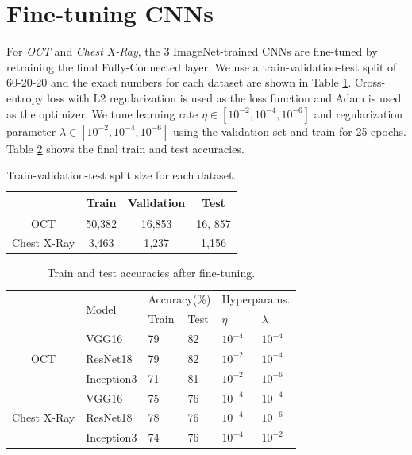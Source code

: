 \section{Fine-tuning CNNs}

For \textit{OCT} and \textit{Chest X-Ray}, the 3 ImageNet-trained CNNs are fine-tuned by retraining the final Fully-Connected layer.
We use a train-validation-test split of 60-20-20 and the exact numbers for each dataset are shown in Table \ref{tbl:dataset_sizes}.
Cross-entropy loss with L2 regularization is used as the loss function and  Adam \cite{kingma2014adam} is used as the optimizer.
We tune learning rate $\eta \in [10^{-2}, 10^{-4}, 10^{-6}]$ and regularization parameter $\lambda \in [10^{-2}, 10^{-4}, 10^{-6}]$ using the validation set and train for 25 epochs.
Table \ref{tbl:finetune_accuracies} shows the final train and test accuracies.

\begin{table}[ht]
\begin{tabular}{cccc}
 & Train & Validation & Test \\ \hline
\hline
OCT & 50,382 & 16,853 & 16, 857 \\ \hline
Chest X-Ray & 3,463 & 1,237 & 1,156 \\ \hline
\end{tabular}
\caption{Train-validation-test split size for each dataset.}
\vspace{-6mm}
\label{tbl:dataset_sizes}
\end{table}

\begin{table}[ht]
\begin{tabular}{|c|l|l|l|l|l|l|}
\hline
\multicolumn{1}{|l|}{\multirow{3}{*}{}} & \multirow{3}{*}{Model} & \multicolumn{2}{l|}{\multirow{2}{*}{Accuracy(\%)}} & \multicolumn{3}{l|}{\multirow{2}{*}{Hyperparams.}} \\
\multicolumn{1}{|l|}{} &  & \multicolumn{2}{l|}{} & \multicolumn{3}{l|}{} \\ \cline{3-7} 
\multicolumn{1}{|l|}{} &  & Train & Test & \multicolumn{2}{l|}{$\eta$} & $\lambda$ \\ \hline
\multirow{3}{*}{OCT} & VGG16 & 79 & 82 & \multicolumn{2}{l|}{$10^{-4}$} & $10^{-4}$ \\ \cline{2-7} 
 & ResNet18 & 79 & 82 & \multicolumn{2}{l|}{$10^{-2}$} & $10^{-4}$ \\ \cline{2-7} 
 & Inception3 & 71 & 81 & \multicolumn{2}{l|}{$10^{-2}$} & $10^{-6}$ \\ \hline
\multirow{3}{*}{Chest X-Ray} & VGG16 & 75 & 76 & \multicolumn{2}{l|}{$10^{-4}$} & $10^{-4}$ \\ \cline{2-7} 
 & ResNet18 & 78 & 76 & \multicolumn{2}{l|}{$10^{-4}$} & $10^{-6}$ \\ \cline{2-7} 
 & Inception3 & 74 & 76 & \multicolumn{2}{l|}{$10^{-4}$} & $10^{-2}$ \\ \hline
\end{tabular}
\caption{Train and test accuracies after fine-tuning.}
\vspace{-6mm}
\label{tbl:finetune_accuracies}
\end{table}


